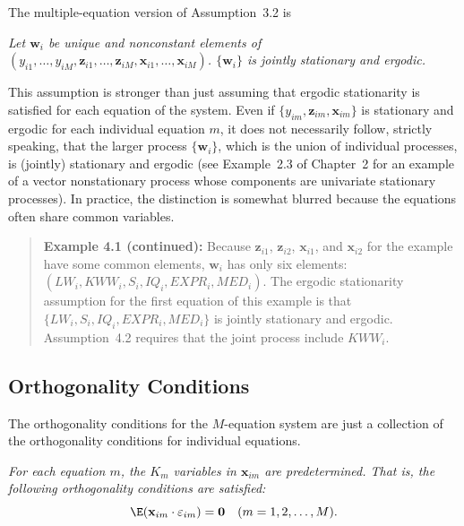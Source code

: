 The multiple-equation version of Assumption~3.2 is

\begin{assumption}
\label{ass:4.2}
\textit{Let\/ $\mathbf{w}_i$ be unique and nonconstant elements
of $(y_{i1}, \ldots, y_{iM}, \mathbf{z}_{i1}, \ldots, \mathbf{z}_{iM},
\mathbf{x}_{i1}, \ldots, \mathbf{x}_{iM})$.
$\{\mathbf{w}_i\}$ is jointly stationary and ergodic.}
\end{assumption}

This assumption is stronger than just assuming that ergodic stationarity is satisfied
for each equation of the system. Even if $\{y_{im}, \mathbf{z}_{im}, \mathbf{x}_{im}\}$
is stationary and ergodic for each individual equation $m$, it does not necessarily follow,
strictly speaking, that the larger process $\{\mathbf{w}_i\}$, which is the union of individual
processes, is (jointly) stationary and ergodic (see Example~2.3 of Chapter~2 for an
example of a vector nonstationary process whose components are univariate stationary
processes). In practice, the distinction is somewhat blurred because the equations
often share common variables.

\begin{quote}
\textbf{Example 4.1 (continued):}\quad
Because $\mathbf{z}_{i1}$, $\mathbf{z}_{i2}$, $\mathbf{x}_{i1}$,
and $\mathbf{x}_{i2}$ for the example have some common elements,
$\mathbf{w}_i$ has only six elements:
$(LW_i, KWW_i, S_i, IQ_i, EXPR_i, MED_i)$.
The ergodic stationarity assumption for the first equation
of this example is that $\{LW_i, S_i, IQ_i, EXPR_i, MED_i\}$ is jointly stationary and
ergodic. Assumption~4.2 requires that the joint process include $KWW_i$.
\end{quote}

\subsection*{Orthogonality Conditions}

The orthogonality conditions for the $M$-equation system are just a collection of the
orthogonality conditions for individual equations.

\begin{assumption}
\label{ass:4.3}
\textit{For each equation $m$, the $K_m$ variables in $\mathbf{x}_{im}$ are predetermined.
That is, the following orthogonality conditions are satisfied:}
\[
\E(\mathbf{x}_{im} \cdot \varepsilon_{im}) = \mathbf{0}
\quad (m = 1, 2, \ldots, M).
\]
\end{assumption}

